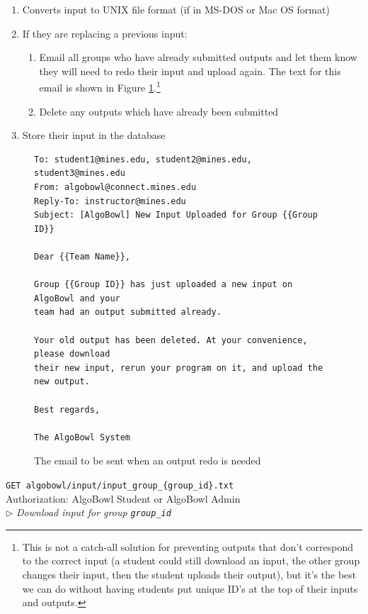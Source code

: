 \documentclass[12pt]{article}
\newcommand\ctrltitle[1]{\par\medskip\texttt{\large #1}\\}
\newcommand\ctrlauth[1]{Authorization: #1\\}
\newcommand\ctrldesc[1]{$\rhd$ \textsl{#1}\par\medskip}
\begin{document}
\begin{enumerate}
    \item Converts input to UNIX file format (if in MS-DOS or Mac OS format)
    \item If they are replacing a previous input:
        \begin{enumerate}
            \item Email all groups who have already submitted outputs and let
                them know they will need to redo their input and upload again.
                The text for this email is shown in Figure
                \ref{emailredo}.\footnote{This is not a catch-all solution for
                preventing outputs that don't correspond to the correct input
                (a student could still download an input, the other group
                changes their input, then the student uploads their output),
                but it's the best we can do without having students put unique
                ID's at the top of their inputs and outputs.}
            \item Delete any outputs which have already been submitted
        \end{enumerate}
    \item Store their input in the database
\end{enumerate}

\begin{figure}[H]
\begin{verbatim}
To: student1@mines.edu, student2@mines.edu, student3@mines.edu
From: algobowl@connect.mines.edu
Reply-To: instructor@mines.edu
Subject: [AlgoBowl] New Input Uploaded for Group {{Group ID}}

Dear {{Team Name}},

Group {{Group ID}} has just uploaded a new input on AlgoBowl and your
team had an output submitted already.

Your old output has been deleted. At your convenience, please download
their new input, rerun your program on it, and upload the new output.

Best regards,

The AlgoBowl System
\end{verbatim}
    \caption{The email to be sent when an output redo is needed}
    \label{emailredo}
\end{figure}

\ctrltitle{GET algobowl/input/input\_group\_\{group\_id\}.txt}
\ctrlauth{AlgoBowl Student or AlgoBowl Admin}
\ctrldesc{Download input for group \texttt{group\_id}}
\end{document}
